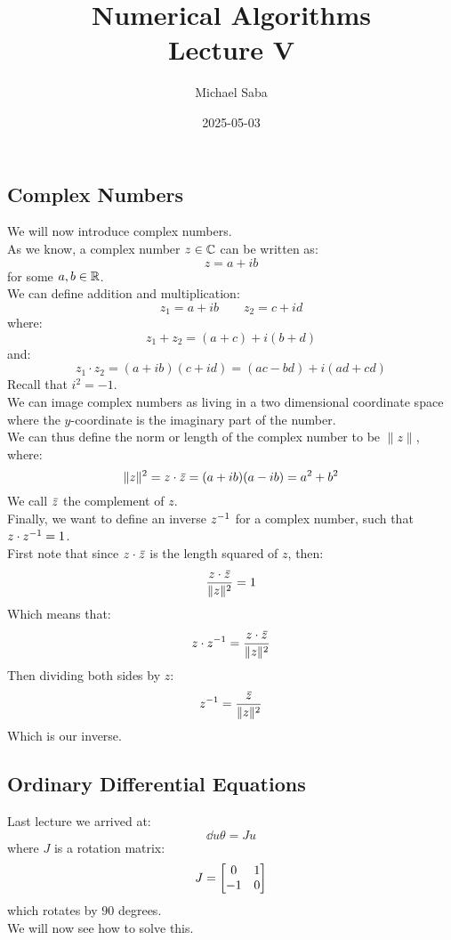 \documentclass[12pt]{article}
\title{%
    \Huge Numerical Algorithms \\
    \Large Lecture V
}
\date{2025-05-03}
\author{Michael Saba}
\begin{document}
\maketitle
\newpage
\setlength{\parindent}{0pt}

\subsection*{Complex Numbers}

We will now introduce complex numbers. \\
As we know, a complex number $z \in \mathbb{C}$
can be written as:
\[ z = a + ib \]
for some $a, b \in \mathbb{R}$. \\
We can define addition and multiplication:
\[ z_1 = a + ib \qquad z_2 = c + id \]
where:
\[ z_1 + z_2 = (a + c) + i(b + d) \]
and:
\[ z_1 \cdot z_2 = 
(a + ib)(c + id) = 
(ac - bd) + i(ad + cd) \]
Recall that $i^2 = -1$. \\

We can image complex numbers as living
in a two dimensional coordinate space
where the $y$-coordinate is the imaginary
part of the number. \\
We can thus define the norm or length
of the complex number to 
be $\|z\|$, where:
\[ \|z\|^2 = z \cdot \,\overline{\!{z}}
= (a + ib)(a - ib) = a^2 + b^2 \]
We call $\,\overline{\!{z}}$ the complement of $z$. \\

Finally, we want to define an inverse
$z^{-1}$ for a complex number, such that
$z \cdot z^{-1} = 1$. \\
First note that since $z \cdot \,\overline{\!{z}}$
is the length squared of $z$, then:
\[ \dfrac{z \cdot \,\overline{\!{z}}}{\|z\|^2} = 1 \]
Which means that:
\[ z \cdot z^{-1} = 
\dfrac{z \cdot \,\overline{\!{z}}}{\|z\|^2} \]
Then dividing both sides by $z$:
\[ z^{-1} = 
\dfrac{\,\overline{\!{z}}}{\|z\|^2} \]
Which is our inverse. \\

\newpage

\subsection*{Ordinary Differential Equations}

Last lecture we arrived at:
\[ \dd{u}{\theta} = Ju \]
where $J$ is a rotation matrix:
\[ J = \begin{bmatrix} 0 & 1 \\ -1 & 0 \end{bmatrix} \]
which rotates by $90$ degrees. \\
We will now see how to solve this. \\
\end{document}
